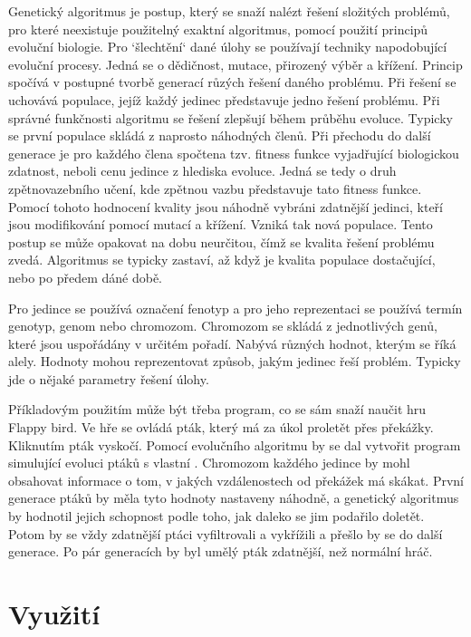 \documentclass[a4paper,11pt, oneside]{book} \usepackage[czech]{babel}
\begin{document}
	Genetický algoritmus je postup, který se snaží nalézt řešení složitých problémů,
	pro které neexistuje použitelný exaktní algoritmus, pomocí použití principů
	evoluční biologie. Pro `šlechtění` dané úlohy se používají techniky napodobující
	evoluční procesy. Jedná se o dědičnost, mutace, přirozený výběr a křížení.
	Princip spočívá v postupné tvorbě generací růzých řešení daného problému.
	Při řešení se uchovává populace, jejíž každý jedinec představuje jedno
	řešení problému. Při správné funkčnosti algoritmu se řešení zlepšují během
	průběhu evoluce. Typicky se první populace skládá z naprosto náhodných členů.
	Při přechodu do další generace je pro každého člena spočtena tzv. fitness funkce
	vyjadřující biologickou zdatnost, neboli cenu jedince z hlediska evoluce. Jedná se
	tedy o druh zpětnovazebního učení, kde zpětnou vazbu představuje tato fitness funkce.
	Pomocí tohoto hodnocení kvality jsou náhodně vybráni zdatnější jedinci,
	kteří jsou modifikování pomocí mutací a křížení. Vzniká tak nová populace.
	Tento postup se může opakovat na dobu neurčitou, čímž se kvalita řešení problému
	zvedá. Algoritmus se typicky zastaví, až když je kvalita populace dostačující,
	nebo po předem dáné době.

	Pro jedince se používá označení fenotyp a pro jeho reprezentaci se používá termín
	genotyp, genom nebo chromozom. Chromozom se skládá z jednotlivých genů,
	které jsou uspořádány v určitém pořadí. Nabývá různých hodnot, kterým se říká alely.
	Hodnoty mohou reprezentovat způsob, jakým jedinec řeší problém. Typicky jde
	o nějaké parametry řešení úlohy.

	Příkladovým použitím může být třeba program, co se sám snaží naučit hru Flappy bird.
	Ve hře se ovládá pták, který má za úkol proletět přes překážky. Kliknutím pták vyskočí.
	Pomocí evolučního algoritmu by se dal vytvořit program simulující evoluci ptáků s vlastní
	. Chromozom každého jedince by mohl obsahovat informace o tom,
	v jakých vzdálenostech od překážek má skákat. První generace ptáků by měla
	tyto hodnoty nastaveny náhodně, a genetický algoritmus by hodnotil jejich schopnost podle
	toho, jak daleko se jim podařilo doletět. Potom by se vždy zdatnější ptáci vyfiltrovali
	a vykřížili a přešlo by se do další generace. Po pár generacích by byl umělý pták zdatnější,
	než normální hráč.



	\section{Využití}
\end{document}
